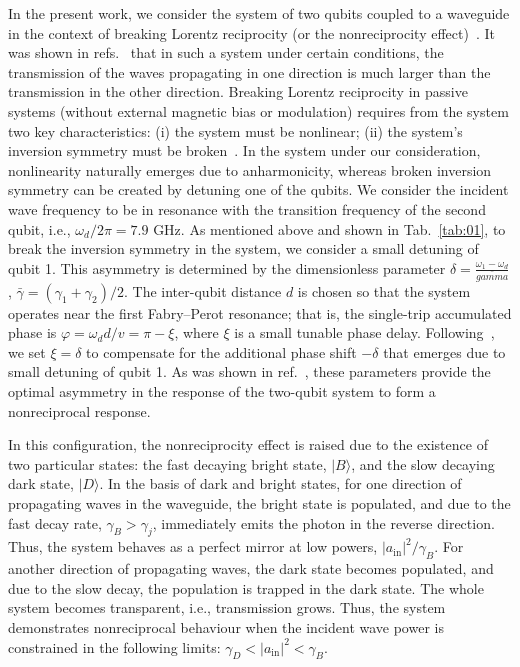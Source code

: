 \documentclass[lettersize,journal]{IEEEtran}
\begin{document}
In the present work, we consider the system of two qubits coupled to a waveguide in the context of breaking Lorentz reciprocity (or the nonreciprocity effect)~\cite{}.
It was shown in refs.~\cite{dai_rectification_2015,muller_nonreciprocal_2017,rosario_hamann_nonreciprocity_2018, Nefedkin2022} that in such a system under certain conditions, the transmission of the waves propagating in one direction is much larger than the transmission in the other direction.
Breaking Lorentz reciprocity in passive systems (without external magnetic bias or modulation) requires from the system two key characteristics: (i) the system must be nonlinear; (ii) the system's inversion symmetry must be broken~\cite{}.
In the system under our consideration, nonlinearity naturally emerges due to anharmonicity, whereas broken inversion symmetry can be created by detuning one of the qubits.
We consider the incident wave frequency to be in resonance with the transition frequency of the second qubit, i.e., $\omega_d / 2\pi = 7.9$ GHz.
As mentioned above and shown in Tab.~\ref{tab:01}, to break the inversion symmetry in the system, we consider a small detuning of qubit 1.
This asymmetry is determined by the dimensionless parameter $\delta = \frac{\omega_1 - \omega_d}{\bar{gamma}}$, $\bar{\gamma} = (\gamma_1 + \gamma_2) / 2$.
The inter-qubit distance $d$ is chosen so that the system operates near the first Fabry–Perot resonance; that is, the single-trip accumulated phase is $\varphi = \omega_d d / v = \pi - \xi$, where $\xi$ is a small tunable phase delay. 
Following~\cite{dai_rectification_2015,muller_nonreciprocal_2017}, we set $\xi = \delta$ to compensate for the additional phase shift $-\delta$ that emerges due to small detuning of qubit 1. 
As was shown in ref.~\cite{muller_nonreciprocal_2017}, these parameters provide the optimal asymmetry in the response of the two-qubit system to form a nonreciprocal response.

In this configuration, the nonreciprocity effect is raised due to the existence of two particular states: the fast decaying bright state, $|B\rangle$, and the slow decaying dark state, $|D\rangle$.
In the basis of dark and bright states, for one direction of propagating waves in the waveguide, the bright state is populated, and due to the fast decay rate, $\gamma_B > \gamma_j$, immediately emits the photon in the reverse direction. 
Thus, the system behaves as a perfect mirror at low powers, $|a_\mathrm{in}|^2 / \gamma_B$.
For another direction of propagating waves, the dark state becomes populated, and due to the slow decay, the population is trapped in the dark state. 
The whole system becomes transparent, i.e., transmission grows.
Thus, the system demonstrates nonreciprocal behaviour when the incident wave power is constrained in the following limits: $ \gamma_D < |a_\mathrm{in}|^2 < \gamma_B$.
\end{document}
